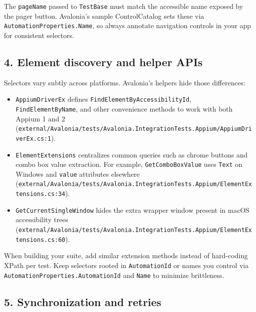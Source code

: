 The \passthrough{\lstinline!pageName!} passed to
\passthrough{\lstinline!TestBase!} must match the accessible name
exposed by the pager button. Avalonia's sample ControlCatalog sets these
via \passthrough{\lstinline!AutomationProperties.Name!}, so always
annotate navigation controls in your app for consistent selectors.

\subsection{4. Element discovery and helper
APIs}\label{element-discovery-and-helper-apis}

Selectors vary subtly across platforms. Avalonia's helpers hide those
differences:

\begin{itemize}
\tightlist
\item
  \passthrough{\lstinline!AppiumDriverEx!} defines
  \passthrough{\lstinline!FindElementByAccessibilityId!},
  \passthrough{\lstinline!FindElementByName!}, and other convenience
  methods to work with both Appium 1 and 2
  (\passthrough{\lstinline!external/Avalonia/tests/Avalonia.IntegrationTests.Appium/AppiumDriverEx.cs:1!}).
\item
  \passthrough{\lstinline!ElementExtensions!} centralizes common queries
  such as chrome buttons and combo box value extraction. For example,
  \passthrough{\lstinline!GetComboBoxValue!} uses
  \passthrough{\lstinline!Text!} on Windows and
  \passthrough{\lstinline!value!} attributes elsewhere
  (\passthrough{\lstinline!external/Avalonia/tests/Avalonia.IntegrationTests.Appium/ElementExtensions.cs:34!}).
\item
  \passthrough{\lstinline!GetCurrentSingleWindow!} hides the extra
  wrapper window present in macOS accessibility trees
  (\passthrough{\lstinline!external/Avalonia/tests/Avalonia.IntegrationTests.Appium/ElementExtensions.cs:60!}).
\end{itemize}

When building your suite, add similar extension methods instead of
hard-coding XPath per test. Keep selectors rooted in
\passthrough{\lstinline!AutomationId!} or names you control via
\passthrough{\lstinline!AutomationProperties.AutomationId!} and
\passthrough{\lstinline!Name!} to minimize brittleness.

\subsection{5. Synchronization and
retries}\label{synchronization-and-retries}

